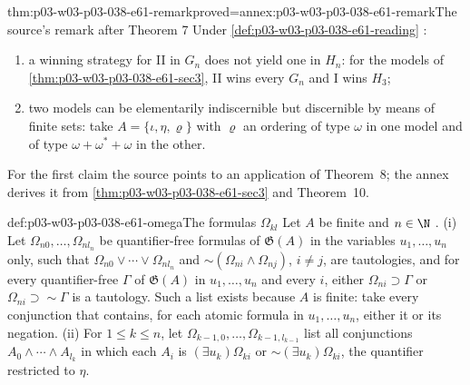 \begin{hbtheorem}{thm:p03-w03-p03-038-e61-remark}{proved=annex:p03-w03-p03-038-e61-remark}{The source's remark after Theorem 7}
Under \cref{def:p03-w03-p03-038-e61-reading} \cite[p.~136]{Ehrenfeucht1961}:
\begin{enumerate}
\item a winning strategy for II in \(G_n\) does not yield one in \(H_n\): for
      the models of \cref{thm:p03-w03-p03-038-e61-sec3}, II wins every
      \(G_n\) and I wins \(H_3\);
\item two models can be elementarily indiscernible but discernible by means
      of finite sets: take \(A=\{\iota,\eta,\varrho\}\) with \(\varrho\) an
      ordering of type \(\omega\) in one model and of type
      \(\omega+\omega^*+\omega\) in the other.
\end{enumerate}
\end{hbtheorem}

For the first claim the source points to an application of Theorem~8; the
annex derives it from \cref{thm:p03-w03-p03-038-e61-sec3} and Theorem~10.

\begin{hbdefinition}{def:p03-w03-p03-038-e61-omega}{The formulas \(\Omega_{kl}\)}
Let \(A\) be finite and \(n\in\N\) \cite[pp.~136--137]{Ehrenfeucht1961}.
(i) Let \(\Omega_{n0},\ldots,\Omega_{nl_n}\) be quantifier-free formulas of
\(\mathfrak G(A)\) in the variables \(u_1,\ldots,u_n\) only, such that
\(\Omega_{n0}\vee\cdots\vee\Omega_{nl_n}\) and
\(\sim(\Omega_{ni}\wedge\Omega_{nj})\), \(i\ne j\), are tautologies, and for
every quantifier-free \(\Gamma\) of \(\mathfrak G(A)\) in
\(u_1,\ldots,u_n\) and every \(i\), either \(\Omega_{ni}\supset\Gamma\) or
\(\Omega_{ni}\supset\sim\Gamma\) is a tautology. Such a list exists because
\(A\) is finite: take every conjunction that contains, for each atomic
formula in \(u_1,\ldots,u_n\), either it or its negation. (ii) For
\(1\le k\le n\), let \(\Omega_{k-1,0},\ldots,\Omega_{k-1,l_{k-1}}\) list all
conjunctions \(A_0\wedge\cdots\wedge A_{l_k}\) in which each \(A_i\) is
\((\exists u_k)\Omega_{ki}\) or \(\sim(\exists u_k)\Omega_{ki}\), the
quantifier restricted to \(\eta\).
\end{hbdefinition}


